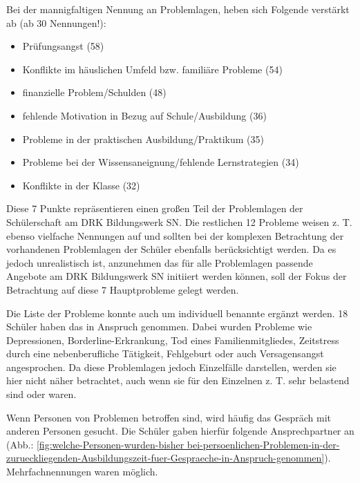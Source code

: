 \noindent
Bei der mannigfaltigen Nennung an Problemlagen, heben sich Folgende verstärkt ab (ab 30 Nennungen!):

\begin{itemize}
	\item Prüfungsangst (58)
	\item Konflikte im häuslichen Umfeld bzw. familiäre Probleme (54)
	\item finanzielle Problem/Schulden (48)
	\item fehlende Motivation in Bezug auf Schule/Ausbildung (36)
	\item Probleme in der praktischen Ausbildung/Praktikum (35)
	\item Probleme bei der Wissensaneignung/fehlende Lernstrategien (34)
	\item Konflikte in der Klasse (32)
\end{itemize}

\noindent
Diese 7 Punkte repräsentieren einen großen Teil der Problemlagen der Schülerschaft am DRK Bildungswerk SN. Die restlichen 12 Probleme weisen z. T. ebenso vielfache Nennungen auf und sollten bei der komplexen Betrachtung der vorhandenen Problemlagen der Schüler ebenfalls berücksichtigt werden. Da es jedoch unrealistisch ist, anzunehmen das für alle Problemlagen passende Angebote am DRK Bildungswerk SN initiiert werden können, soll der Fokus der Betrachtung auf diese 7 Hauptprobleme gelegt werden.

Die Liste der Probleme konnte auch um individuell benannte ergänzt werden. 18 Schüler haben das in Anspruch genommen. Dabei wurden Probleme wie Depressionen, Borderline-Erkrankung, Tod eines Familienmitgliedes, Zeitstress durch eine nebenberufliche Tätigkeit, Fehlgeburt oder auch Versagensangst angesprochen. Da diese Problemlagen jedoch Einzelfälle darstellen, werden sie hier nicht näher betrachtet, auch wenn sie für den Einzelnen z. T. sehr belastend sind oder waren.

Wenn Personen von Problemen betroffen sind, wird häufig das Gespräch mit anderen Personen gesucht. Die Schüler gaben hierfür folgende Ansprechpartner an (Abb.: \ref{fig:welche-Personen-wurden-bisher bei-persoenlichen-Problemen-in-der-zurueckliegenden-Ausbildungszeit-fuer-Gespraeche-in-Anspruch-genommen}). Mehrfachnennungen waren möglich. 

